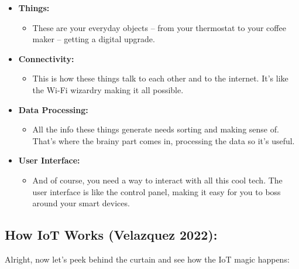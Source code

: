 \documentclass[
  letterpaper,
  DIV=11,
  numbers=noendperiod]{scrreprt}
\providecommand{\tightlist}{%
  \setlength{\itemsep}{0pt}\setlength{\parskip}{0pt}}\usepackage{longtable,booktabs,array}
\begin{document}
\begin{itemize}
\item
  \textbf{Things:}

  \begin{itemize}
  \tightlist
  \item
    These are your everyday objects -- from your thermostat to your
    coffee maker -- getting a digital upgrade.
  \end{itemize}
\item
  \textbf{Connectivity:}

  \begin{itemize}
  \tightlist
  \item
    This is how these things talk to each other and to the internet.
    It's like the Wi-Fi wizardry making it all possible.
  \end{itemize}
\item
  \textbf{Data Processing:}

  \begin{itemize}
  \tightlist
  \item
    All the info these things generate needs sorting and making sense
    of. That's where the brainy part comes in, processing the data so
    it's useful.
  \end{itemize}
\item
  \textbf{User Interface:}

  \begin{itemize}
  \tightlist
  \item
    And of course, you need a way to interact with all this cool tech.
    The user interface is like the control panel, making it easy for you
    to boss around your smart devices.
  \end{itemize}
\end{itemize}

\subsection{How IoT Works (Velazquez
2022):}\label{how-iot-works-velazquez2022iot}

Alright, now let's peek behind the curtain and see how the IoT magic
happens:
\end{document}
